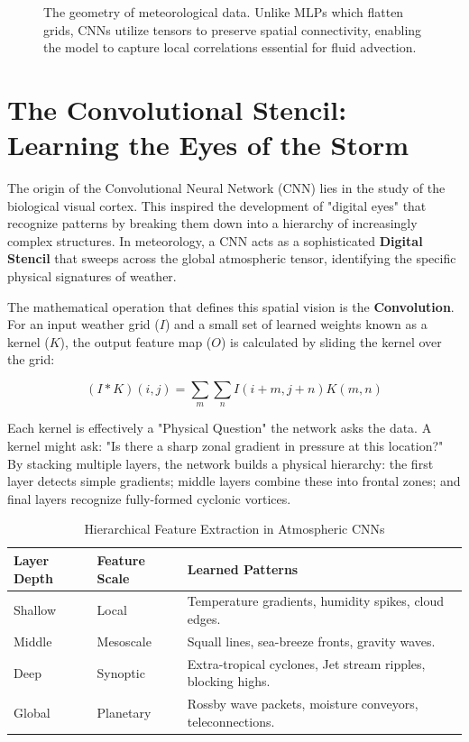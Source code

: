 \begin{figure}[H]
    \centering
    \caption{The geometry of meteorological data. Unlike MLPs which flatten grids, CNNs utilize tensors to preserve spatial connectivity, enabling the model to capture local correlations essential for fluid advection.}
    \label{fig:tensor_geometry}
\end{figure}

\section{The Convolutional Stencil: Learning the Eyes of the Storm}

The origin of the Convolutional Neural Network (CNN) lies in the study of the biological visual cortex. This inspired the development of "digital eyes" that recognize patterns by breaking them down into a hierarchy of increasingly complex structures. In meteorology, a CNN acts as a sophisticated \textbf{Digital Stencil} that sweeps across the global atmospheric tensor, identifying the specific physical signatures of weather. 

The mathematical operation that defines this spatial vision is the \textbf{Convolution}. For an input weather grid ($I$) and a small set of learned weights known as a kernel ($K$), the output feature map ($O$) is calculated by sliding the kernel over the grid:

\begin{equation}
(I * K)(i, j) = \sum_{m} \sum_{n} I(i + m, j + n) K(m, n)
\end{equation}

Each kernel is effectively a "Physical Question" the network asks the data. A kernel might ask: "Is there a sharp zonal gradient in pressure at this location?" By stacking multiple layers, the network builds a physical hierarchy: the first layer detects simple gradients; middle layers combine these into frontal zones; and final layers recognize fully-formed cyclonic vortices.

\begin{table}[H]
\centering
\caption{Hierarchical Feature Extraction in Atmospheric CNNs}
\begin{tabular}{|l|l|p{8cm}|}
\hline
\textbf{Layer Depth} & \textbf{Feature Scale} & \textbf{Learned Patterns} \\ \hline
Shallow & Local & Temperature gradients, humidity spikes, cloud edges. \\ \hline
Middle & Mesoscale & Squall lines, sea-breeze fronts, gravity waves. \\ \hline
Deep & Synoptic & Extra-tropical cyclones, Jet stream ripples, blocking highs. \\ \hline
Global & Planetary & Rossby wave packets, moisture conveyors, teleconnections. \\ \hline
\end{tabular}
\end{table}

